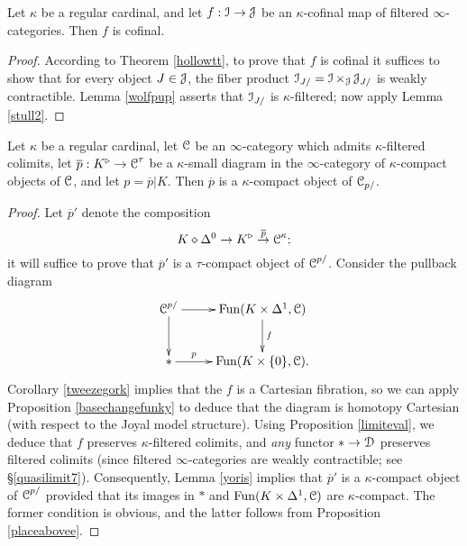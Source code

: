 \begin{lemma}\label{cofinalwolf}
Let $\kappa$ be a regular cardinal, and let $f: \operatorname{\mathcal{I}} \rightarrow \operatorname{\mathcal{J}}$ be an $\kappa$-cofinal map
of filtered $\infty$-categories. Then $f$ is cofinal.
\end{lemma}

\begin{proof}
According to Theorem \ref{hollowtt}, to prove that $f$ is cofinal it suffices to show that for every
object $J \in \operatorname{\mathcal{J}}$, the fiber product $\operatorname{\mathcal{I}}_{J/} = \operatorname{\mathcal{I}} \times_{\operatorname{\mathcal{J}}} \operatorname{\mathcal{J}}_{J/}$ is weakly contractible. Lemma \ref{wolfpup} asserts that $\operatorname{\mathcal{I}}_{J/}$ is $\kappa$-filtered; now apply Lemma \ref{stull2}.
\end{proof}

\begin{lemma}\label{lemmatp}
Let $\kappa$ be a regular cardinal, let $\operatorname{\mathcal{C}}$ be an $\infty$-category which
admits $\kappa$-filtered colimits, let $\overline{p}: K^{\triangleright} \rightarrow \operatorname{\mathcal{C}}^{\tau}$ be a $\kappa$-small diagram in the $\infty$-category of $\kappa$-compact objects of $\operatorname{\mathcal{C}}$, and let
$p = \overline{p} | K$. Then $\overline{p}$ is a $\kappa$-compact object of $\operatorname{\mathcal{C}}_{p/}$. 
\end{lemma}

\begin{proof}
Let $\overline{p}'$ denote the composition
$$ K \diamond \Delta^0 \rightarrow K^{\triangleright} \stackrel{\overline{p}}{\rightarrow} \operatorname{\mathcal{C}}^{\kappa};$$ it will suffice to prove that $\overline{p}'$ is a $\tau$-compact object
of $\operatorname{\mathcal{C}}^{p/}$. Consider the pullback diagram
$$ \xymatrix{ \calC^{p/} \ar[r] \ar[d] & \Fun(K \times \Delta^1, \calC) \ar[d]^{f} \\
\ast \ar[r]^-{p} & \Fun(K \times \{0\}, \calC). } $$
Corollary \ref{tweezegork} implies that the $f$ is a Cartesian fibration, so we can apply Proposition \ref{basechangefunky} to deduce that the diagram is homotopy Cartesian (with respect to the Joyal model structure). Using Proposition \ref{limiteval}, we deduce that $f$ preserves $\kappa$-filtered colimits, and {\em any} functor $\ast \rightarrow \operatorname{\mathcal{D}}$ preserves filtered colimits (since filtered $\infty$-categories are weakly contractible; see \S \ref{quasilimit7}). Consequently, Lemma \ref{yoris} implies that $\overline{p}'$ is a $\kappa$-compact object of $\operatorname{\mathcal{C}}^{p/}$ provided that its images in $\ast$ and $\operatorname{Fun}(K \times \Delta^1, \operatorname{\mathcal{C}})$ are $\kappa$-compact. The former condition is obvious, and the latter follows from Proposition \ref{placeabovee}.
\end{proof}

